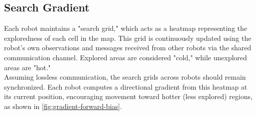 \subsection{Search Gradient}
\label{sec:search-gradient}

Each robot maintains a "search grid," which acts as a heatmap representing the exploredness of each cell in the map. This grid is continuously updated using the robot’s own observations and messages received from other robots via the shared communication channel. Explored areas are considered "cold," while unexplored areas are "hot."\\

Assuming lossless communication, the search grids across robots should remain synchronized. Each robot computes a directional gradient from this heatmap at its current position, encouraging movement toward hotter (less explored) regions, as shown in \cref{fig:gradient-forward-bias}.

